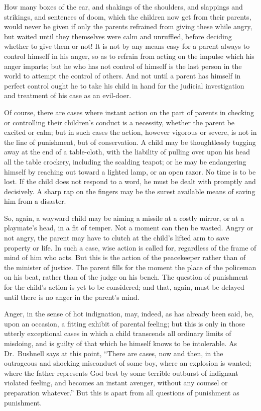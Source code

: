 \documentclass[
]{book}
\begin{document}
How many boxes of the ear, and shakings of the shoulders, and slappings and strikings, and sentences of doom, which the children now get from their parents, would never be given if only the parents refrained from giving these while angry, but waited until they themselves were calm and unruffled, before deciding whether to give them or not! It is not by any means easy for a parent always to control himself in his anger, so as to refrain from acting on the impulse which his anger imparts; but he who has not control of himself is the last person in the world to attempt the control of others. And not until a parent has himself in perfect control ought he to take his child in hand for the judicial investigation and treatment of his case as an evil-doer.

Of course, there are cases where instant action on the part of parents in checking or controlling their children's conduct is a necessity, whether the parent be excited or calm; but in such cases the action, however vigorous or severe, is not in the line of punishment, but of conservation. A child may be thoughtlessly tugging away at the end of a table-cloth, with the liability of pulling over upon his head all the table crockery, including the scalding teapot; or he may be endangering himself by reaching out toward a lighted lamp, or an open razor. No time is to be lost. If the child does not respond to a word, he must be dealt with promptly and decisively. A sharp rap on the fingers may be the surest available means of saving him from a disaster.

So, again, a wayward child may be aiming a missile at a costly mirror, or at a playmate's head, in a fit of temper. Not a moment can then be wasted. Angry or not angry, the parent may have to clutch at the child's lifted arm to save property or life. In such a case, wise action is called for, regardless of the frame of mind of him who acts. But this is the action of the peacekeeper rather than of the minister of justice. The parent fills for the moment the place of the policeman on his beat, rather than of the judge on his bench. The question of punishment for the child's action is yet to be considered; and that, again, must be delayed until there is no anger in the parent's mind.

Anger, in the sense of hot indignation, may, indeed, as has already been said, be, upon an occasion, a fitting exhibit of parental feeling; but this is only in those utterly exceptional cases in which a child transcends all ordinary limits of misdoing, and is guilty of that which he himself knows to be intolerable. As Dr.~Bushnell says at this point, ``There are cases, now and then, in the outrageous and shocking misconduct of some boy, where an explosion is wanted; where the father represents God best by some terrible outburst of indignant violated feeling, and becomes an instant avenger, without any counsel or preparation whatever.'' But this is apart from all questions of punishment as punishment.
\end{document}
